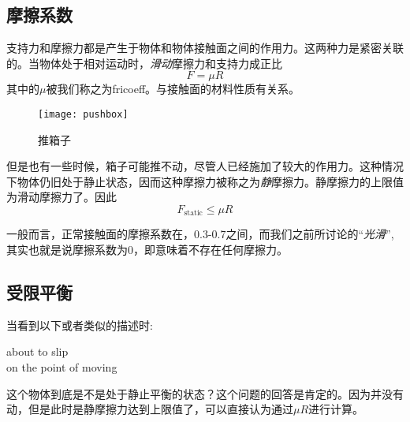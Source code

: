 \subsection*{摩擦系数}
支持力和摩擦力都是产生于物体和物体接触面之间的作用力。这两种力是紧密关联的。当物体处于相对运动时，\emph{滑动}摩擦力和支持力成正比
\[
	F=\mu R
\]
其中的$\mu$被我们称之为\gls{fricoeff}。与接触面的材料性质有关系。

\begin{figure}[H]
\centering
\texttt{[image: pushbox]}
\caption{推箱子}
\end{figure}

但是也有一些时候，箱子可能推不动，尽管人已经施加了较大的作用力。这种情况下物体仍旧处于静止状态，因而这种摩擦力被称之为\emph{静}摩擦力。静摩擦力的上限值为滑动摩擦力了。因此
\[
	F_{\text{static}} \leqslant \mu R
\]

一般而言，正常接触面的摩擦系数在，$0.3$-$0.7$之间，而我们之前所讨论的``\emph{光滑}'',其实也就是说摩擦系数为$0$，即意味着不存在任何摩擦力。

\subsection*{受限平衡}
当看到以下或者类似的描述时:
\begin{center}
about to slip\\
on the point of moving
\end{center}
这个物体到底是不是处于静止平衡的状态？这个问题的回答是肯定的。因为并没有动，但是此时是静摩擦力达到上限值了，可以直接认为通过$\mu R$进行计算。